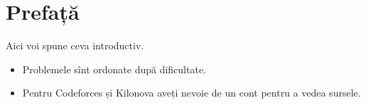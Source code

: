 \chapter*{Prefață}

Aici voi spune ceva introductiv.

\begin{itemize}
  \item Problemele sînt ordonate după dificultate.
  \item Pentru Codeforces și Kilonova aveți nevoie de un cont pentru a vedea sursele.
\end{itemize}
